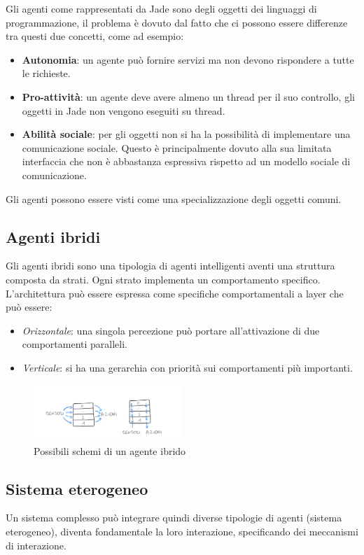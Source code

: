 Gli agenti come rappresentati da Jade sono degli oggetti dei linguaggi di
programmazione, il problema è dovuto dal fatto che ci possono essere differenze
tra questi due concetti, come ad esempio:
\begin{itemize}
    \item \textbf{Autonomia}: un agente può fornire servizi ma non devono
          rispondere a tutte le richieste.
    \item \textbf{Pro-attività}: un agente deve avere almeno un thread per il
          suo controllo, gli oggetti in Jade non vengono eseguiti su thread.
    \item \textbf{Abilità sociale}: per gli oggetti non si ha la possibilità di
          implementare una comunicazione sociale. Questo è principalmente dovuto
          alla sua limitata interfaccia che non è abbastanza espressiva rispetto
          ad un modello sociale di comunicazione.
\end{itemize}
Gli agenti possono essere visti come una specializzazione degli oggetti comuni.
\subsection{Agenti ibridi}
Gli agenti ibridi sono una tipologia di agenti intelligenti aventi una struttura
composta da strati. Ogni strato implementa un comportamento specifico.
L'architettura può essere espressa come specifiche comportamentali a layer che
può essere:
\begin{itemize}
    \item \textit{Orizzontale}: una singola percezione può portare all'attivazione
          di due comportamenti paralleli.
    \item \textit{Verticale}: si ha una gerarchia con priorità sui comportamenti
          più importanti.
\end{itemize}
\begin{figure}[!ht]
    \centering
    \includegraphics[width=0.50\textwidth]{./img/Agenti/agente_ibrido.jpg}
    \caption{Possibili schemi di un agente ibrido}
    \label{fig:Agente_ibrido}
\end{figure}
\subsection{Sistema eterogeneo}
Un sistema complesso può integrare quindi diverse tipologie di agenti
(sistema eterogeneo), diventa fondamentale la loro interazione, specificando dei
meccanismi di interazione.

